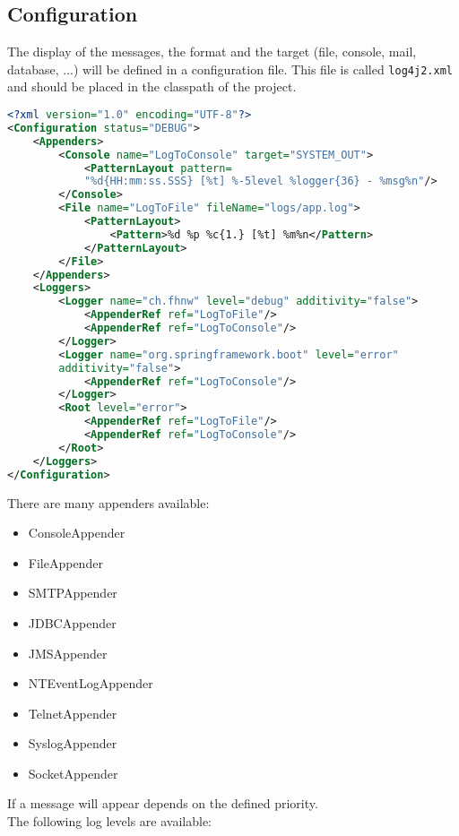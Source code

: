 \subsection{Configuration}
The display of the messages, the format and the target (file, console, mail,
database, ...) will be defined in a configuration file. This file
is called \verb|log4j2.xml| and should be placed in the classpath
of the project.

\begin{lstlisting}[language=xml]
<?xml version="1.0" encoding="UTF-8"?>
<Configuration status="DEBUG">
    <Appenders>
        <Console name="LogToConsole" target="SYSTEM_OUT">
            <PatternLayout pattern=
            "%d{HH:mm:ss.SSS} [%t] %-5level %logger{36} - %msg%n"/>
        </Console>
        <File name="LogToFile" fileName="logs/app.log">
            <PatternLayout>
                <Pattern>%d %p %c{1.} [%t] %m%n</Pattern>
            </PatternLayout>
        </File>
    </Appenders>
    <Loggers>
        <Logger name="ch.fhnw" level="debug" additivity="false">
            <AppenderRef ref="LogToFile"/>
            <AppenderRef ref="LogToConsole"/>
        </Logger>
        <Logger name="org.springframework.boot" level="error"
        additivity="false">
            <AppenderRef ref="LogToConsole"/>
        </Logger>
        <Root level="error">
            <AppenderRef ref="LogToFile"/>
            <AppenderRef ref="LogToConsole"/>
        </Root>
    </Loggers>
</Configuration>
\end{lstlisting}

There are many appenders available:

\begin{itemize}
\item ConsoleAppender
\item FileAppender
\item SMTPAppender
\item JDBCAppender
\item JMSAppender
\item NTEventLogAppender
\item TelnetAppender
\item SyslogAppender
\item SocketAppender
\end{itemize}

If a message will appear depends on the defined priority.\\
The following log levels are available:

